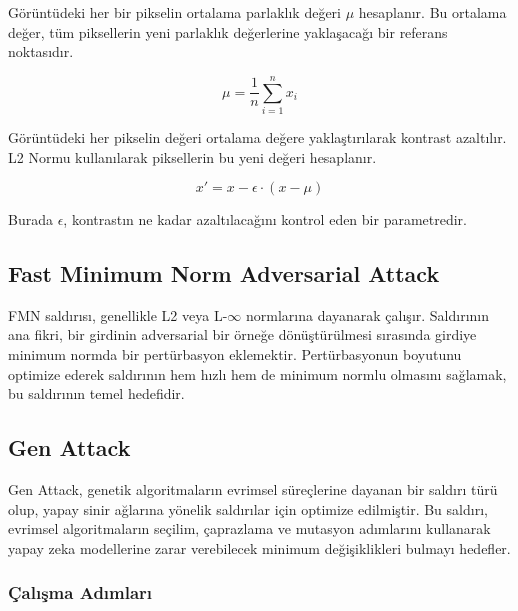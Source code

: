Görüntüdeki her bir pikselin ortalama parlaklık değeri $\mu$ hesaplanır. Bu ortalama değer, tüm piksellerin yeni parlaklık değerlerine yaklaşacağı bir referans noktasıdır.

\[ \mu = \frac{1}{n} \sum_{i=1}^{n} x_i \]

Görüntüdeki her pikselin değeri ortalama değere yaklaştırılarak kontrast azaltılır. L2 Normu kullanılarak piksellerin bu yeni değeri hesaplanır.

\[ x' = x - \epsilon \cdot (x - \mu) \]

Burada $\epsilon$, kontrastın ne kadar azaltılacağını kontrol eden bir parametredir.

\newpage

\subsection{Fast Minimum Norm Adversarial Attack}

FMN saldırısı, genellikle L2 veya L-$\infty$ normlarına dayanarak çalışır. Saldırının ana fikri, bir girdinin adversarial bir örneğe dönüştürülmesi sırasında girdiye minimum normda bir pertürbasyon eklemektir. Pertürbasyonun boyutunu optimize ederek saldırının hem hızlı hem de minimum normlu olmasını sağlamak, bu saldırının temel hedefidir.

\newpage

\subsection{Gen Attack}

Gen Attack, genetik algoritmaların evrimsel süreçlerine dayanan bir saldırı türü olup, yapay sinir ağlarına yönelik saldırılar için optimize edilmiştir. Bu saldırı, evrimsel algoritmaların seçilim, çaprazlama ve mutasyon adımlarını kullanarak yapay zeka modellerine zarar verebilecek minimum değişiklikleri bulmayı hedefler.

\subsubsection{Çalışma Adımları}

